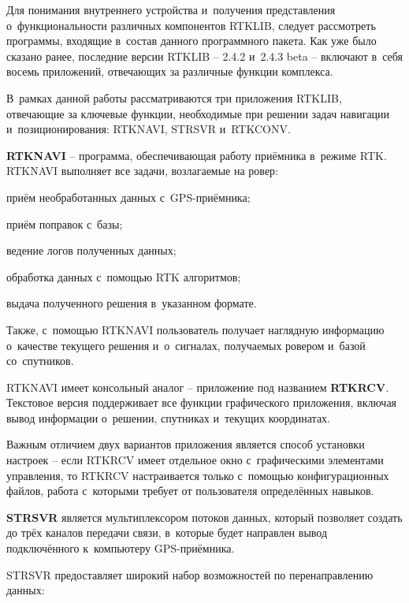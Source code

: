 Для понимания внутреннего устройства и~получения представления о~функциональности различных компонентов RTKLIB, следует рассмотреть программы, входящие в~состав данного программного пакета. Как уже было сказано ранее, последние версии RTKLIB -- 2.4.2 и~2.4.3 beta -- включают в~себя восемь приложений, отвечающих за различные функции комплекса. \par

В~рамках данной работы рассматриваются три приложения RTKLIB, отвечающие за ключевые функции, необходимые при решении задач навигации и~позиционирования: RTKNAVI, STRSVR и~RTKCONV.

\begin{dashitemize}
  \item \textbf{RTKNAVI} -- программа, обеспечивающая работу приёмника в~режиме RTK. RTKNAVI выполняет все задачи, возлагаемые на ровер:
  \begin{dashitemize}
    \item приём необработанных данных с~GPS-приёмника;
    \item приём поправок с~базы;
    \item ведение логов полученных данных;
    \item обработка данных с~помощью RTK алгоритмов;
    \item выдача полученного решения в~указанном формате.
  \end{dashitemize}

  Также, с~помощью RTKNAVI пользователь получает наглядную информацию о~качестве текущего решения и~о~сигналах, получаемых ровером и~базой со~спутников. \par
  
  RTKNAVI имеет консольный аналог -- приложение под названием \textbf{RTKRCV}. Текстовое версия поддерживает все функции графического приложения, включая вывод информации о~решении, спутниках и~текущих координатах. \par
  Важным отличием двух вариантов приложения является способ установки настроек -- если RTKRCV имеет отдельное окно с~графическими элементами управления, то RTKRCV настраивается только с~помощью конфигурационных файлов, работа с~которыми требует от пользователя определённых навыков.
  
  \item \textbf{STRSVR} является мультиплексором потоков данных, который позволяет создать до трёх каналов передачи связи, в~которые будет направлен вывод подключённого к~компьютеру GPS-приёмника. \par
  STRSVR предоставляет широкий набор возможностей по перенаправлению данных:
  

\end{dashitemize}
